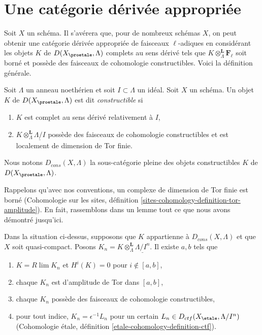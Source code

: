 \section{Une catégorie dérivée appropriée}
\label{section-suitable-derived}

\noindent
Soit $X$ un schéma. Il s'avérera que, pour de nombreux schémas $X$, on peut obtenir une
catégorie dérivée appropriée de faisceaux $\ell$-adiques en considérant les
objets $K$ de $D(X_\proetale, \Lambda)$ complets au sens dérivé tels
que $K \otimes_\Lambda^\mathbf{L} \mathbf{F}_\ell$ soit borné et possède des
faisceaux de cohomologie constructibles. Voici la définition générale.

\begin{definition}
\label{definition-Dbc}
Soit $\Lambda$ un anneau noethérien et soit $I \subset \Lambda$ un idéal.
Soit $X$ un schéma. Un objet $K$ de $D(X_\proetale, \Lambda)$ est dit
{\it constructible} si
\begin{enumerate}
\item $K$ est complet au sens dérivé relativement à $I$,
\item $K \otimes_\Lambda^\mathbf{L} \underline{\Lambda/I}$
possède des faisceaux de cohomologie constructibles et est localement de dimension de Tor finie.
\end{enumerate}
Nous notons $D_{cons}(X, \Lambda)$ la sous-catégorie pleine des objets constructibles
$K$ de $D(X_\proetale, \Lambda)$.
\end{definition}

\noindent
Rappelons qu'avec nos conventions, un complexe de dimension de Tor finie
est borné (Cohomologie sur les sites, définition
\ref{sites-cohomology-definition-tor-amplitude}).
En fait, rassemblons dans un lemme tout ce que nous avons démontré jusqu'ici.

\begin{lemma}
\label{lemma-describe-constructible-complexes}
Dans la situation ci-dessus, supposons que $K$ appartienne à $D_{cons}(X, \Lambda)$
et que $X$ soit quasi-compact. Posons
$K_n = K \otimes_\Lambda^\mathbf{L} \underline{\Lambda/I^n}$.
Il existe $a, b$ tels que
\begin{enumerate}
\item $K = R\lim K_n$ et $H^i(K) = 0$ pour $i \not \in [a, b]$,
\item chaque $K_n$ est d'amplitude de Tor dans $[a, b]$,
\item chaque $K_n$ possède des faisceaux de cohomologie constructibles,
\item pour tout indice, $K_n = \epsilon^{-1}L_n$ pour un certain
$L_n \in D_{ctf}(X_\etale, \Lambda/I^n)$
(Cohomologie \'etale, définition \ref{etale-cohomology-definition-ctf}).
\end{enumerate}
\end{lemma}

